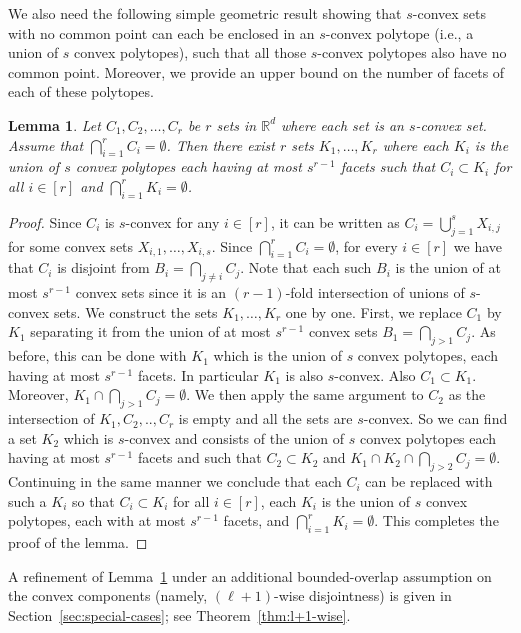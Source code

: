 \documentclass[11pt]{article}
\def\Re{\mathbb R}
\theoremstyle{plain}
\newtheorem{lemma}[theorem]{Lemma}
\theoremstyle{definition}
\theoremstyle{remark}
\begin{document}
We also need the following simple geometric result showing
that $s$-convex sets with no common point can each be 
enclosed in an $s$-convex 
polytope (i.e., a union of $s$ convex polytopes), such that all those $s$-convex polytopes also have no common
point. Moreover, we provide an upper bound on the number of facets of 
each of these polytopes. 

\begin{lemma}\label{lem:r-separation}
 Let $C_1,C_2,\ldots,C_r$ be $r$ sets in $\Re^d$ where each set is an
 $s$-convex set. Assume that $\bigcap_{i=1}^r C_i= \emptyset$. Then there
 exist $r$ sets $K_1,\ldots, K_r$ where each $K_i$ is the union of $s$
	convex polytopes each  having at most $s^{r-1}$ facets 
	such that $C_i
 \subset K_i$ for all $i \in [r]$ and $\bigcap_{i=1}^r K_i = \emptyset$.
\end{lemma}

\begin{proof}
Since $C_i$ is $s$-convex for any $i \in [r]$, it can be
written as $C_i = \bigcup_{j=1}^s X_{i,j}$  for some convex sets
$X_{i,1},\ldots,X_{i,s}$.  Since $\bigcap_{i=1}^r C_i =\emptyset$,
for every $i \in [r]$ we have that $C_i$ is disjoint from $B_i
= \bigcap_{j \neq i} C_j$. Note that each such $B_i$ is the
union of at most $s^{r-1}$ convex sets since it is an $(r-1)$-fold
intersection of unions of $s$-convex sets. We construct the sets
$K_1,\ldots,K_r$ one by one. First, we replace  $C_1$ by $K_1$
separating it from the union of at most $s^{r-1}$ convex sets
$B_1= \bigcap_{j>1} C_j$. As before, this can be done with $K_1$
which is the union of $s$ convex polytopes, each having
	at most $s^{r-1}$ facets. In particular $K_1$ is also $s$-convex. Also $C_1 \subset K_1$. Moreover,  $K_1
\cap \bigcap_{j>1} C_j=\emptyset$. We then apply the same argument to $C_2$
as the intersection of $K_1,C_2,..,C_r$ is empty and all the sets
are $s$-convex. So we can find a set $K_2$ which is $s$-convex 
	and consists of the union of $s$ convex polytopes each having
	at most $s^{r-1}$ facets and such that $C_2 \subset K_2$ and $K_1 \cap K_2 \cap
\bigcap_{j > 2}C_j = \emptyset$. Continuing in the same manner we conclude that
each $C_i$ can be replaced with  such a $K_i$ so that $C_i
\subset K_i$ for all $i \in [r]$, each $K_i$ is the union of $s$
	convex polytopes, each with at most $s^{r-1}$ facets,
	and $\bigcap_{i=1}^r
K_i = \emptyset$.  This completes the proof of the lemma.
\end{proof}

A refinement of Lemma~\ref{lem:r-separation} under an additional bounded-overlap assumption on the convex components
(namely, $(\ell+1)$-wise disjointness) is given in Section~\ref{sec:special-cases}; see Theorem~\ref{thm:l+1-wise}.
\end{document}
